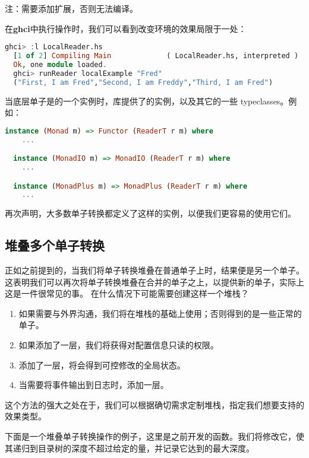 \documentclass[./main.tex]{subfiles}
\begin{document}
注：需要添加扩展，否则无法编译。

在\textbf{ghci}中执行操作时，我们可以看到改变环境的效果局限于一处：

\begin{lstlisting}[language=Haskell]
  ghci> :l LocalReader.hs
  [1 of 2] Compiling Main             ( LocalReader.hs, interpreted )
  Ok, one module loaded.
  ghci> runReader localExample "Fred"
  ("First, I am Fred","Second, I am Freddy","Third, I am Fred")
\end{lstlisting}

当底层单子是的一个实例时，库提供了的实例，以及其它的一些 typeclasses。例如：

\begin{lstlisting}[language=Haskell]
  instance (Monad m) => Functor (ReaderT r m) where
    ...

  instance (MonadIO m) => MonadIO (ReaderT r m) where
    ...

  instance (MonadPlus m) => MonadPlus (ReaderT r m) where
    ...
\end{lstlisting}

再次声明，大多数单子转换都定义了这样的实例，以便我们更容易的使用它们。

\subsection*{堆叠多个单子转换}

正如之前提到的，当我们将单子转换堆叠在普通单子上时，结果便是另一个单子。这表明我们可以再次将单子转换堆叠在合并的单子之上，以提供新的单子，实际上这是一件很常见的事。
在什么情况下可能需要创建这样一个堆栈？

\begin{enumerate}
  \item 如果需要与外界沟通，我们将在堆栈的基础上使用；否则得到的是一些正常的单子。
  \item 如果添加了一层，我们将获得对配置信息只读的权限。
  \item 添加了一层，将会得到可控修改的全局状态。
  \item 当需要将事件输出到日志时，添加一层。
\end{enumerate}

这个方法的强大之处在于，我们可以根据确切需求定制堆栈，指定我们想要支持的效果类型。

下面是一个堆叠单子转换操作的例子，这里是之前开发的函数。我们将修改它，使其递归到目录树的深度不超过给定的量，并记录它达到的最大深度。
\end{document}
